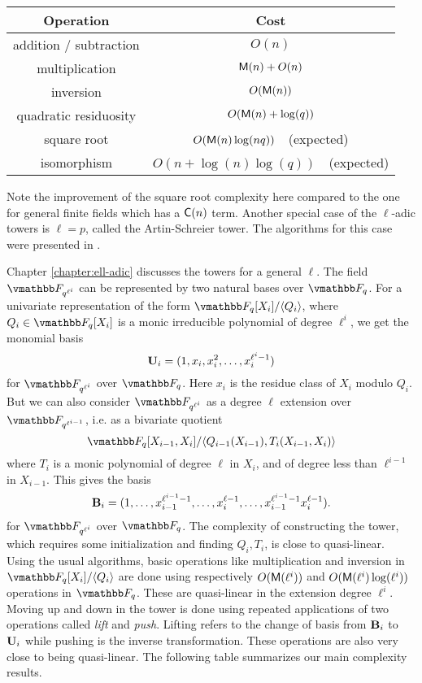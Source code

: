 \begin{center}
	\begin{tabular}{c|c}
		Operation & Cost \\
		\hline
		addition / subtraction & $O(n)$\\
		multiplication & $\mathsf{M}(n)+O(n)$\\
		inversion & $O(\mathsf{M}(n))$\\
		quadratic residuosity & $O(\mathsf{M}(n)+\log(q))$ \\
		square root &  $O(\mathsf{M}(n)\log(nq))$\ \ (expected) \\
		isomorphism &  $O(n + \log(n)\log(q))$\ \ (expected)
	\end{tabular}
\end{center}
Note the improvement of the square root complexity here compared to the one for general finite 
fields which has a $\mathsf{C}(n)$ term. Another special case of the $\ell$-adic towers is $\ell = p$, 
called the Artin-Schreier tower. The algorithms for this case were presented in \cite{DeSc12}.

Chapter \ref{chapter:ell-adic} discusses the towers for a general $\ell$. The field 
$\F_{q^{\ell^i}}$ can be represented by two natural bases over $\F_q$. For a univariate 
representation of the form $\F_q[X_i]/\ang{Q_i}$, where $Q_i \in \F_q[X_i]$ is a monic irreducible 
polynomial of degree $\ell^i$, we get the monomial basis
\[ \mathbf{U}_i = (1,x_{i},x_{i}^2,\ldots,x_{i}^{\ell^{i}-1}) \] 
for $\F_{q^{\ell^i}}$ over $\F_q$. Here $x_i$ is the residue class of $X_i$ modulo $Q_i$. But we 
can also consider $\F_{q^{\ell^i}}$ as a degree $\ell$ extension over $\F_{q^{\ell^{i - 1}}}$, 
i.e. as a bivariate quotient
\[ \F_q[X_{i-1},X_i]/\ang{Q_{i-1}(X_{i-1}), T_i(X_{i-1},X_i)} \]
where $T_i$ is a monic polynomial of degree $\ell$ in $X_i$, and of degree less than $\ell^{i-1}$ 
in $X_{i-1}$. This gives the basis
\[ \mathbf{B}_{i} = (1,\ldots,x_{i-1}^{\ell^{i-1}-1},\ldots,x_i^{\ell-1},\ldots, x_{i-1}^{\ell^{i-1}-1}
x_i^{\ell-1}). \]
for $\F_{q^{\ell^i}}$ over $\F_q$. The complexity of constructing the tower, which requires some 
initialization and finding $Q_i, T_i$, is close to quasi-linear. Using the usual algorithms, basic 
operations like multiplication and inversion in $\F_q[X_i]/\ang{Q_i}$ are done using respectively 
$O(\mathsf{M}(\ell^i))$ and $O(\mathsf{M}(\ell^i)\log(\ell^i))$ operations in $\F_q$. These are quasi-linear in 
the extension degree $\ell^i$. Moving up and down in the tower is done using repeated applications 
of two operations called \textit{lift} and \textit{push}. Lifting refers to the change of basis 
from $\mathbf{B}_i$ to $\mathbf{U}_i$ while pushing is the inverse transformation. These operations are also 
very close to being quasi-linear. The following table summarizes our main complexity results.

